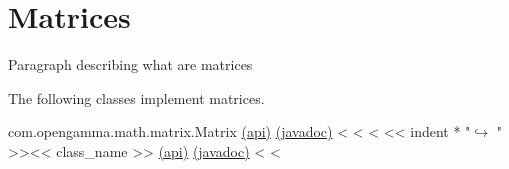 \section{Matrices}

Paragraph describing what are matrices

The following classes implement matrices.

\begin{fullwidth}

com.opengamma.math.matrix.Matrix \href{http://docs-static.hq.opengamma.com/0.7.0/analytics/api/com.opengamma.math.matrix.Matrix.html#class-com.opengamma.math.matrix.Matrix}{(api)} \href{http://docs-static.hq.opengamma.com/0.7.0/analytics/javadoc/com/opengamma/math/matrix/Matrix}{(javadoc)}
<%
<%
<%
<< indent * "$\hookrightarrow$ " >><< class_name >> \href{http://docs-static.hq.opengamma.com/0.7.0/analytics/api/<< package_name >>.html#class-<<class_name>>}{(api)} \href{http://docs-static.hq.opengamma.com/0.7.0/analytics/javadoc/<< class_name.replace(".","/") >>.html}{(javadoc)}
<%
<%

\end{fullwidth}

